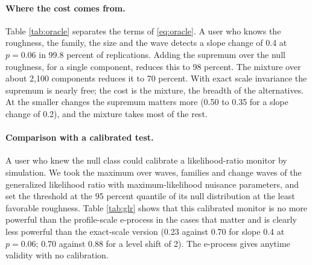 \documentclass[11pt]{article}
\theoremstyle{plain}
\theoremstyle{definition}
\begin{document}
\paragraph{Where the cost comes from.} Table \ref{tab:oracle} separates the terms of \eqref{eq:oracle}. A user who knows the roughness, the family, the size and the wave detects a slope change of 0.4 at $p=0.06$ in 99.8 percent of replications. Adding the supremum over the null roughness, for a single component, reduces this to 98 percent. The mixture over about 2,100 components reduces it to 70 percent. With exact scale invariance the supremum is nearly free; the cost is the mixture, the breadth of the alternatives. At the smaller changes the supremum matters more (0.50 to 0.35 for a slope change of 0.2), and the mixture takes most of the rest.

\begin{table}[t]
\centering\small
\caption{Probability of declaring by the last wave at level 0.05 for the known-roughness likelihood ratio, a single component with the supremum denominator, and the full universal e-process (400 replications, change at wave 25).}
\label{tab:oracle}

\end{table}

\paragraph{Comparison with a calibrated test.} A user who knew the null class could calibrate a likelihood-ratio monitor by simulation. We took the maximum over waves, families and change waves of the generalized likelihood ratio with maximum-likelihood nuisance parameters, and set the threshold at the 95 percent quantile of its null distribution at the least favorable roughness. Table \ref{tab:glr} shows that this calibrated monitor is no more powerful than the profile-scale e-process in the cases that matter and is clearly less powerful than the exact-scale version (0.23 against 0.70 for slope 0.4 at $p=0.06$; 0.70 against 0.88 for a level shift of 2). The e-process gives anytime validity with no calibration.

\begin{table}[t]
\centering\small
\caption{Probability of declaring for the calibrated generalized likelihood-ratio monitor and for the two e-processes (300--400 replications; independent replications, so differences of 0.05 are within noise).}
\label{tab:glr}

\end{table}
\end{document}
